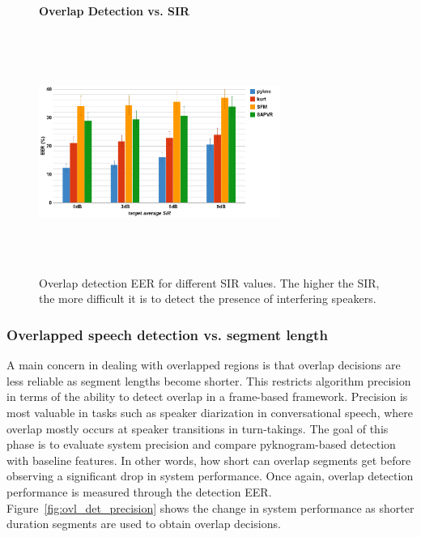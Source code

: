 {\begin{figure}[h!]
	\centering
	\hspace{-1mm}
	\textbf{Overlap Detection vs. SIR}\par\medskip
	\includegraphics[height = 3.1in, width=0.7\textwidth]{figures/ovldet_vs_sir}
	\vspace{-1mm}
	\caption{Overlap detection EER for different SIR values. The higher the SIR, the more difficult it is to detect the presence of interfering speakers.}
	\vspace{0mm}
	\label{fig:ovl_det}
\end{figure}



\newpage
\subsubsection{Overlapped speech detection vs. segment length}
A main concern in dealing with overlapped regions is that overlap decisions are less reliable as segment lengths become shorter. 
This restricts algorithm precision in terms of the ability to detect overlap in a frame-based framework. 
Precision is most valuable in tasks such as speaker diarization in conversational speech, where overlap mostly occurs at speaker transitions in turn-takings. 
The goal of this phase is to evaluate system precision and compare pyknogram-based detection with baseline features. 
In other words, how short can overlap segments get before observing a significant drop in system performance. 
Once again, overlap detection performance is measured through the detection EER. 
Figure~\ref{fig:ovl_det_precision} shows the change in system performance as shorter duration segments are used to obtain overlap decisions. 


}
